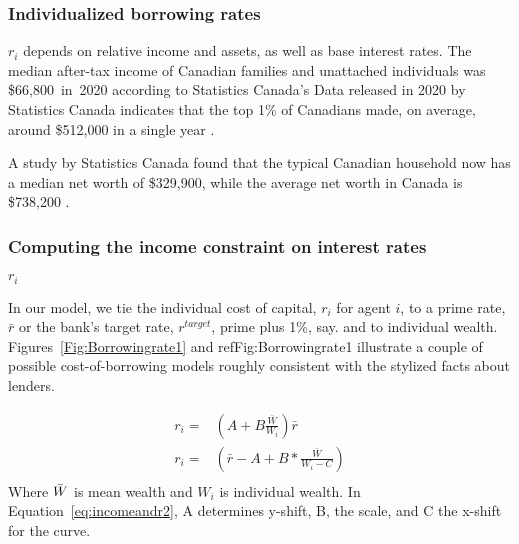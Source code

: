 \subsubsection{Individualized borrowing rates}\label{SS:BorowingRate}
 
 
 $r_i$ depends on relative income and assets, as well as base interest rates. %
 The median after-tax income of Canadian families and unattached individuals was \$66,800 in 2020 according to Statistics Canada's %
 Data released in 2020 by Statistics Canada indicates that the top 1\% of Canadians made, on average, around \$512,000 in a single year \cite{stats-can-canadian-incomes}. %

 A study by Statistics Canada found that the typical Canadian household now has a median net worth of \$329,900, while the average net worth in Canada is \$738,200 \cite{stats-can-median-net-worth}.  %

\subsubsection{Computing the income constraint on interest rates}\label{SS:YWealthConstraint}
$r_i$

In our model, we  tie the individual cost of capital,  $r_i$ for agent $i$, to a prime rate, $\bar r$ or the bank's target rate, $r^{target}$, prime plus 1\%, say. and to individual wealth. Figures~\ref{Fig:Borrowingrate1} and ref{Fig:Borrowingrate1} illustrate a couple of possible  cost-of-borrowing models roughly consistent  with the stylized facts about lenders. 

\begin{align}
 r_i =  &  \left(A + B \frac{\bar{W}}{W_i}\right) \bar r       \label{eq:incomeandr1}  \\
 r_i =  &  \left(\bar r - A + B *\frac{\bar W}{W_i - C}\right) \label{eq:incomeandr2}  \\
\end{align}
Where $\Bar{W}$ is mean wealth and $W_i$ is individual wealth. In Equation~\ref{eq:incomeandr2},  A determines y-shift, B, the scale, and C the  x-shift for the curve.


